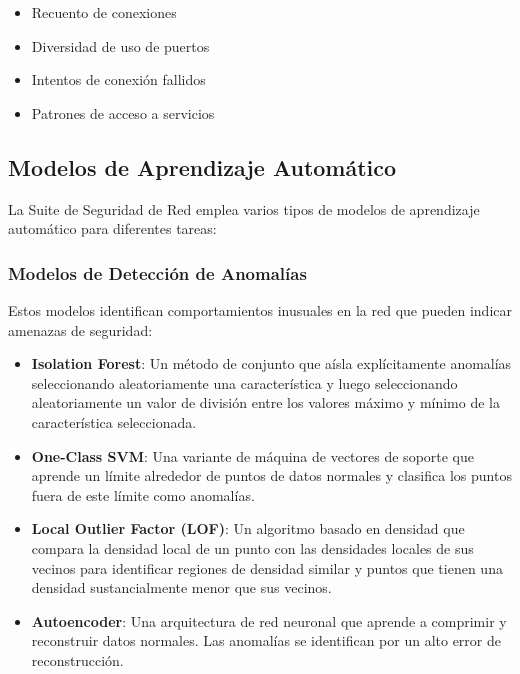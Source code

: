 \begin{itemize}
    \item Recuento de conexiones
    \item Diversidad de uso de puertos
    \item Intentos de conexión fallidos
    \item Patrones de acceso a servicios
\end{itemize}

\subsection{Modelos de Aprendizaje Automático}
La Suite de Seguridad de Red emplea varios tipos de modelos de aprendizaje automático para diferentes tareas:

\subsubsection{Modelos de Detección de Anomalías}
Estos modelos identifican comportamientos inusuales en la red que pueden indicar amenazas de seguridad:

\begin{itemize}
    \item \textbf{Isolation Forest}: Un método de conjunto que aísla explícitamente anomalías seleccionando aleatoriamente una característica y luego seleccionando aleatoriamente un valor de división entre los valores máximo y mínimo de la característica seleccionada.
    
    \item \textbf{One-Class SVM}: Una variante de máquina de vectores de soporte que aprende un límite alrededor de puntos de datos normales y clasifica los puntos fuera de este límite como anomalías.
    
    \item \textbf{Local Outlier Factor (LOF)}: Un algoritmo basado en densidad que compara la densidad local de un punto con las densidades locales de sus vecinos para identificar regiones de densidad similar y puntos que tienen una densidad sustancialmente menor que sus vecinos.
    
    \item \textbf{Autoencoder}: Una arquitectura de red neuronal que aprende a comprimir y reconstruir datos normales. Las anomalías se identifican por un alto error de reconstrucción.
\end{itemize}

